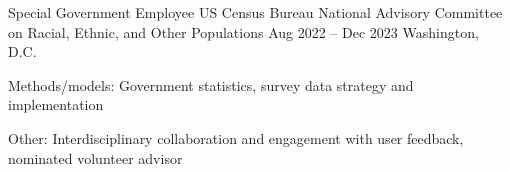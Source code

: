 \documentclass[letterpaper]{resume_config}
\begin{document}

\WorkExperience
    {Special Government Employee}  
    {US Census Bureau National Advisory Committee on Racial, Ethnic, and Other Populations}  
    {Aug 2022 -- Dec 2023}  
    {Washington, D.C.}  
    { 
        \item Methods/models: Government statistics, survey data strategy and implementation
        \item Other:  Interdisciplinary collaboration and engagement with user feedback, nominated volunteer advisor  
    } 
\end{document}
